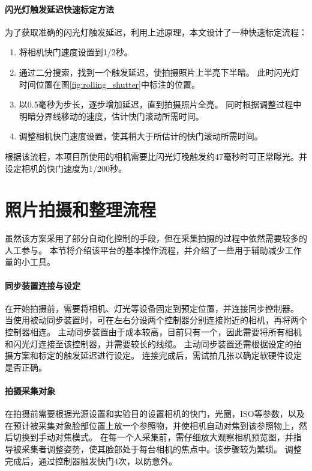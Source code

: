 \paragraph{闪光灯触发延迟快速标定方法}
为了获取准确的闪光灯触发延迟，利用上述原理，本文设计了一种快速标定流程：
\begin{enumerate}
\item 将相机快门速度设置到1/2秒。
\item 通过二分搜索，找到一个触发延迟，使拍摄照片上半亮下半暗。
此时闪光灯时间位置在图\ref{fig:rolling_shutter}中标注的位置。
\item 以0.5毫秒为步长，逐步增加延迟，直到拍摄照片全亮。
同时根据调整过程中明暗分界线移动的速度，估计快门滚动所需时间。
\item 调整相机快门速度设置，使其稍大于所估计的快门滚动所需时间。
\end{enumerate}
根据该流程，本项目所使用的相机需要比闪光灯晚触发约47毫秒时可正常曝光。并设定相机的快门速度为1/200秒。

\section{照片拍摄和整理流程}

虽然该方案采用了部分自动化控制的手段，但在采集拍摄的过程中依然需要较多的人工参与。
本节将介绍该平台的基本操作流程，并介绍了一些用于辅助减少工作量的小工具。

\paragraph{同步装置连接与设定}
在开始拍摄前，需要将相机、灯光等设备固定到预定位置，并连接同步控制器。
当使用被动同步装置时，可在左右分设两个控制器分别连接附近的相机，再将两个控制器相连。
主动同步装置由于成本较高，目前只有一个，因此需要将所有相机和闪光灯连接至该控制器，并需要较长的线缆。
主动同步装置还需根据设定的拍摄方案和标定的触发延迟进行设定。
连接完成后，需试拍几张以确定软硬件设定是否正确。

\paragraph{拍摄采集对象}
在拍摄前需要根据光源设置和实验目的设置相机的快门，光圈，ISO等参数，以及在预计被采集对象脸部位置上放一个参照物，并使相机自动对焦到该参照物上，然后切换到手动对焦模式。
在每一个人采集前，需仔细放大观察相机预览图，并指导被采集者调整姿势，使其脸部处于每台相机的焦点中。该步骤较为繁琐。
调整完成后，通过控制器触发快门4次，以防意外。

